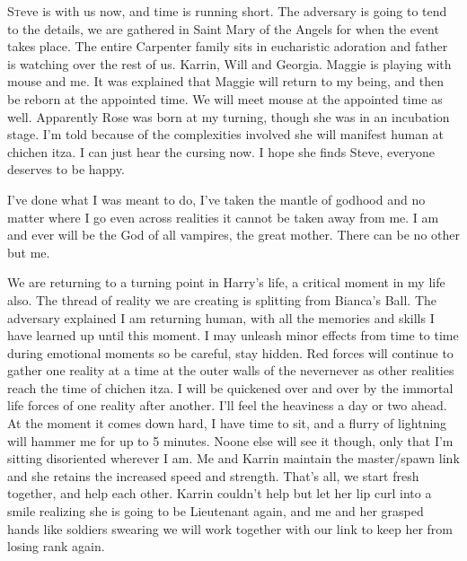 \lettrine[lines=2,lraise=0]{S}teve is with us now, and time is running short. The adversary is going to tend to the details, we are gathered in Saint Mary of the Angels for when the event takes place. The entire Carpenter family sits in eucharistic adoration and father is watching over the rest of us. Karrin, Will and Georgia. Maggie is playing with mouse and me. It was explained that Maggie will return to my being, and then be reborn at the appointed time. We will meet mouse at the appointed time as well. Apparently Rose was born at my turning, though she was in an incubation stage. I'm told because of the complexities involved she will manifest human at chichen itza. I can just hear the cursing now. I hope she finds Steve, everyone deserves to be happy.

I've done what I was meant to do, I've taken the mantle of godhood and no matter where I go even across realities it cannot be taken away from me. I am and ever will be the God of all vampires, the great mother. There can be no other but me.

We are returning to a turning point in Harry's life, a critical moment in my life also. The thread of reality we are creating is splitting from Bianca's Ball. The adversary explained I am returning human, with all the memories and skills I have learned up until this moment. I may unleash minor effects from time to time during emotional moments so be careful, stay hidden. Red forces will continue to gather one reality at a time at the outer walls of the nevernever as other realities reach the time of chichen itza. I will be quickened over and over by the immortal life forces of one reality after another. I'll feel the heaviness a day or two ahead. At the moment it comes down hard, I have time to sit, and a flurry of lightning will hammer me for up to 5 minutes. Noone else will see it though, only that I'm sitting disoriented wherever I am. Me and Karrin maintain the master/spawn link and she retains the increased speed and strength. That's all, we start fresh together, and help each other. Karrin couldn't help but let her lip curl into a smile realizing she is going to be Lieutenant again, and me and her grasped hands like soldiers swearing we will work together with our link to keep her from losing rank again.

